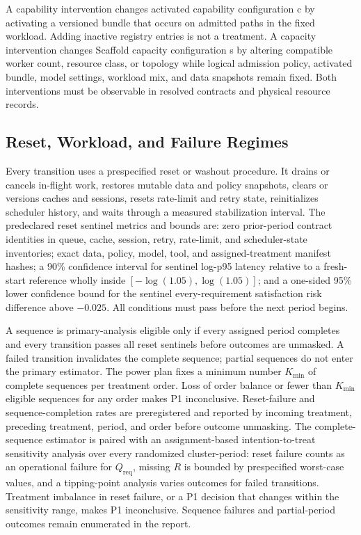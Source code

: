 A capability intervention changes activated capability configuration c by activating a versioned bundle that occurs on admitted paths in the fixed workload. Adding inactive registry entries is not a treatment. A capacity intervention changes Scaffold capacity configuration s by altering compatible worker count, resource class, or topology while logical admission policy, activated bundle, model settings, workload mix, and data snapshots remain fixed. Both interventions must be observable in resolved contracts and physical resource records.

\subsection{Reset, Workload, and Failure Regimes}

Every transition uses a prespecified reset or washout procedure. It drains or cancels in-flight work, restores mutable data and policy snapshots, clears or versions caches and sessions, resets rate-limit and retry state, reinitializes scheduler history, and waits through a measured stabilization interval. The predeclared reset sentinel metrics and bounds are: zero prior-period contract identities in queue, cache, session, retry, rate-limit, and scheduler-state inventories; exact data, policy, model, tool, and assigned-treatment manifest hashes; a 90\% confidence interval for sentinel log-p95 latency relative to a fresh-start reference wholly inside $[-\log(1.05),\log(1.05)]$; and a one-sided 95\% lower confidence bound for the sentinel every-requirement satisfaction risk difference above $-0.025$. All conditions must pass before the next period begins.

A sequence is primary-analysis eligible only if every assigned period completes and every transition passes all reset sentinels before outcomes are unmasked. A failed transition invalidates the complete sequence; partial sequences do not enter the primary estimator. The power plan fixes a minimum number $K_{\min}$ of complete sequences per treatment order. Loss of order balance or fewer than $K_{\min}$ eligible sequences for any order makes P1 inconclusive. Reset-failure and sequence-completion rates are preregistered and reported by incoming treatment, preceding treatment, period, and order before outcome unmasking. The complete-sequence estimator is paired with an assignment-based intention-to-treat sensitivity analysis over every randomized cluster-period: reset failure counts as an operational failure for $Q_{\mathrm{req}}$, missing $R$ is bounded by prespecified worst-case values, and a tipping-point analysis varies outcomes for failed transitions. Treatment imbalance in reset failure, or a P1 decision that changes within the sensitivity range, makes P1 inconclusive. Sequence failures and partial-period outcomes remain enumerated in the report.

